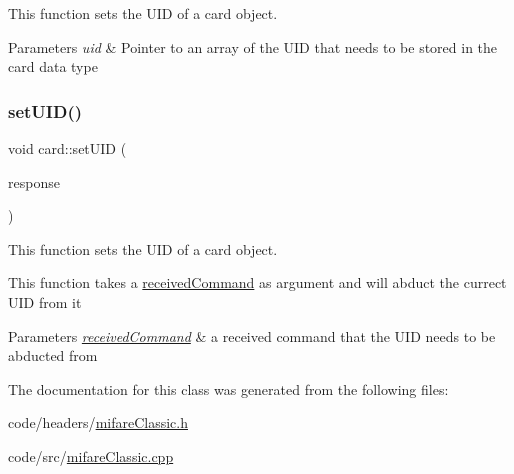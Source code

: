 This function sets the U\+ID of a card object. 


\begin{DoxyParams}{Parameters}
{\em uid} & Pointer to an array of the U\+ID that needs to be stored in the card data type \\
\hline
\end{DoxyParams}
\mbox{\label{classcard_aacc4d5b92c92e3e7e2304d1b9dd17ddd}} 
\subsubsection{\texorpdfstring{set\+U\+I\+D()}{setUID()}\hspace{0.1cm}{\footnotesize\ttfamily [2/2]}}
{\footnotesize\ttfamily void card\+::set\+U\+ID (\begin{DoxyParamCaption}\item[{\hyperlink{classreceivedCommand}{received\+Command} \&}]{response }\end{DoxyParamCaption})}



This function sets the U\+ID of a card object. 

This function takes a \hyperlink{classreceivedCommand}{received\+Command} as argument and will abduct the currect U\+ID from it 
\begin{DoxyParams}{Parameters}
{\em \hyperlink{classreceivedCommand}{received\+Command}} & a received command that the U\+ID needs to be abducted from \\
\hline
\end{DoxyParams}


The documentation for this class was generated from the following files\+:\begin{DoxyCompactItemize}
\item 
code/headers/\hyperlink{mifareClassic_8h}{mifare\+Classic.\+h}\item 
code/src/\hyperlink{mifareClassic_8cpp}{mifare\+Classic.\+cpp}\end{DoxyCompactItemize}
